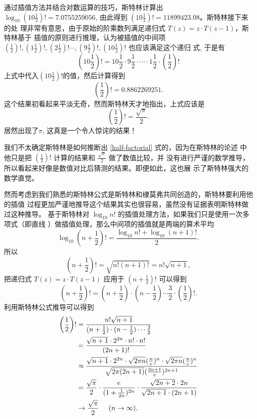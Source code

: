 {通过插值方法并结合对数运算的技巧，斯特林计算出 $\log_{10} (10\frac{1}{2})!=
7.0755259056$, 由此得到 $(10\frac{1}{2})! = 11899423.08$。斯特林接下来的处
理非常有意思，由于原始的阶乘数列满足递归式 $T(z) = z \cdot T(z-1)$，斯特林基于
插值的原则进行推理，认为被插值的中间项 $(\frac{1}{2})!, (1\frac{1}{2})!,
(2\frac{1}{2})!  \cdots, (9\frac{1}{2})!, (10\frac{1}{2})!$ 也应该满足这个递归
式, 于是有 
$$ \left(10\frac{1}{2}\right)! = 10\frac{1}{2} \cdot
9\frac{1}{2} \cdot  \cdots \cdot  1\frac{1}{2} \cdot \left(\frac{1}{2}\right)! $$ 
上式中代入$(10\frac{1}{2})!$的值，然后计算得到 
$$\left(\frac{1}{2}\right)! = 0.8862269251 .$$
这个结果初看起来平淡无奇，然而斯特林天才地指出，上式应该是
\begin{equation}
\label{half-factorial}
\left(\frac{1}{2}\right)! = \frac{\sqrt\pi}{2} .
\end{equation}
居然出现了$\pi$, 这真是一个令人惊诧的结果！

我们不太确定斯特林是如何推断出 \eqref{half-factorial} 式的，因为在斯特林的论述
中他只是把 $(\frac{1}{2})!$ 计算的结果和 $\frac{\sqrt\pi}{2}$ 做了数值比较，并
没有进行严谨的数学推导，所以看起来好像是数值对比后猜测的结果。即便如此，这也展
示了斯特林强大的数学直觉。

然而考虑到我们熟悉的斯特林公式是斯特林和棣莫弗共同创造的，斯特林要利用他的插值
过程更加严谨地推导这个结果其实也很容易，虽然没有证据表明斯特林做过这种推导。
基于斯特林对 $\log_{10} n!$ 的插值处理方法，如果我们只是使用一次多项式（即直线
）做插值处理，那么中间项的插值就是两端的算术平均
$$ \log_{10} \left(n+\frac{1}{2}\right)! = \frac{\log_{10} n! + \log_{10} (n+1)!}{2} .$$
所以
$$ \left(n+\frac{1}{2}\right)! = \sqrt{n! (n+1)!} = n! \sqrt{n+1} ,$$
把递归式 $T(z) = z \cdot T(z-1)$ 应用于 $(n+\frac{1}{2})!$ 可以得到
$$ \left(n+\frac{1}{2}\right)! 
= (n+\frac{1}{2}) \cdot (n-\frac{1}{2}) \cdots \frac{3}{2} \cdot \left(\frac{1}{2}\right)! .$$
利用斯特林公式推导可以得到
\begin{align*}
\left(\frac{1}{2}\right)! & = \frac {n! \sqrt{n+1}} {(n+\frac{1}{2}) 
\cdot (n-\frac{1}{2}) \cdots \frac{3}{2}} \\
& = \frac {\sqrt{n+1} \cdot 2^{2n} \cdot n! \cdot n!} {(2n+1)!}  \\
& \displaystyle \approx \displaystyle \frac {\sqrt{n+1} \cdot 2^{2n}  
\cdot \sqrt{2\pi n} (\frac{n}{e})^n \cdot \sqrt{2\pi n} (\frac{n}{e})^n} 
{\sqrt{2\pi(2n+1)} (\frac{2n+1}{e})^{2n+1}} \\
& = \displaystyle \frac{\sqrt\pi}{2} \cdot \frac{e}{(1+\frac{1}{2n})^{2n}}  
\cdot \frac{\sqrt{2n+2}\cdot 2n}{\sqrt{2n+1}\cdot (2n+1)} \\
& \rightarrow \frac{\sqrt\pi}{2} \hspace{0.5cm} (n \rightarrow \infty) .
\end{align*}

}
